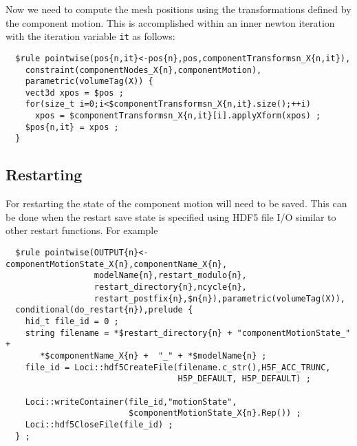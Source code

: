 \documentclass{article}
\begin{document}
Now we need to compute the mesh positions using the transformations
defined by the component motion.  This is accomplished within an inner
newton iteration with the iteration variable {\tt it} as follows:
\begin{verbatim}
  $rule pointwise(pos{n,it}<-pos{n},pos,componentTransformsn_X{n,it}),
    constraint(componentNodes_X{n},componentMotion),
    parametric(volumeTag(X)) {
    vect3d xpos = $pos ;
    for(size_t i=0;i<$componentTransformsn_X{n,it}.size();++i)
      xpos = $componentTransformsn_X{n,it}[i].applyXform(xpos) ;
    $pos{n,it} = xpos ;
  }    
\end{verbatim}

\subsection{Restarting}
For restarting the state of the component motion will need to be
saved.  This can be done when the restart save state is specified
using HDF5 file I/O similar to other restart functions.  For example
\begin{verbatim}
  $rule pointwise(OUTPUT{n}<-componentMotionState_X{n},componentName_X{n},
                  modelName{n},restart_modulo{n},
                  restart_directory{n},ncycle{n},
                  restart_postfix{n},$n{n}),parametric(volumeTag(X)),
  conditional(do_restart{n}),prelude {
    hid_t file_id = 0 ;
    string filename = *$restart_directory{n} + "componentMotionState_" +
       *$componentName_X{n} +  "_" + *$modelName{n} ;
    file_id = Loci::hdf5CreateFile(filename.c_str(),H5F_ACC_TRUNC,
                                   H5P_DEFAULT, H5P_DEFAULT) ;
      
    Loci::writeContainer(file_id,"motionState",
                         $componentMotionState_X{n}.Rep()) ;
    Loci::hdf5CloseFile(file_id) ;
  } ;
\end{verbatim}
\end{document}
